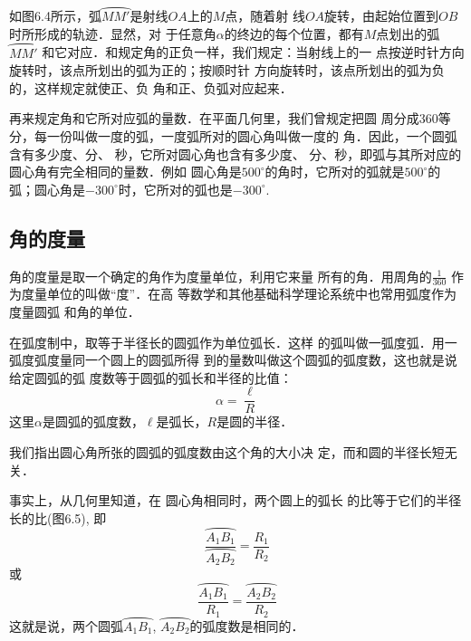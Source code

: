 如图6.4所示，弧$\wideparen{MM'}$是射线$OA$上的$M$点，随着射
线$OA$旋转，由起始位置到$OB$时所形成的轨迹．显然，对
于任意角$\alpha$的终边的每个位置，都有$M$点划出的弧$\wideparen{MM'}$
和它对应．和规定角的正负一样，我们规定：当射线上的一
点按逆时针方向旋转时，该点所划出的弧为正的；按顺时针
方向旋转时，该点所划出的弧为负的，这样规定就使正、负
角和正、负弧对应起来．

再来规定角和它所对应弧的量数．在平面几何里，我们曾规定把圆
周分成360等分，每一份叫做一度的弧，一度弧所对的圆心角叫做一度的
角．因此，一个圆弧含有多少度、分、
秒，它所对圆心角也含有多少度、
分、秒，即弧与其所对应的圆心角有完全相同的量数．例如
圆心角是$500^{\circ}$的角时，它所对的弧就是$500^{\circ}$的弧；圆心角是$-300^{\circ}$时，它所对的弧也是$-300^{\circ}$.

\subsection{角的度量}
角的度量是取一个确定的角作为度量单位，利用它来量
所有的角．用周角的$\frac{1}{360}$
作为度量单位的叫做“度”．在高
等数学和其他基础科学理论系统中也常用弧度作为度量圆弧
和角的单位．

在弧度制中，取等于半径长的圆弧作为单位弧长．这样
的弧叫做一弧度弧．用一弧度弧度量同一个圆上的圆弧所得
到的量数叫做这个圆弧的弧度数，这也就是说给定圆弧的弧
度数等于圆弧的弧长和半径的比值：
\begin{equation}
    \alpha=\frac{\ell}{R}
\end{equation}
这里$\alpha$是圆弧的弧度数，$\ell$是弧长，$R$是圆的半径．

我们指出圆心角所张的圆弧的弧度数由这个角的大小决
定，而和圆的半径长短无关．

事实上，从几何里知道，在
圆心角相同时，两个圆上的弧长
的比等于它们的半径长的比(图6.5), 即
\[\frac{\wideparen{A_1B_1}}{\wideparen{A_2B_2}}=\frac{R_1}{R_2}\]
或\[\frac{\wideparen{A_1B_1}}{R_1}=\frac{\wideparen{A_2B_2}}{R_2}\]
这就是说，两个圆弧$\wideparen{A_1B_1}$, $\wideparen{A_2B_2}$的弧度数是相同的．

\begin{figure}[htp]
    \centering
{}
    \caption{}
\end{figure}

